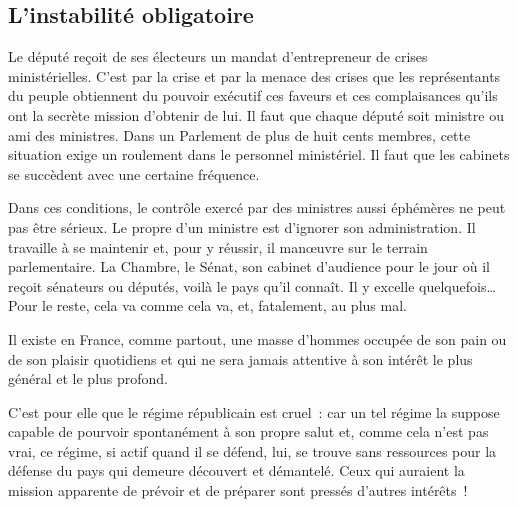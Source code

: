 \documentclass[french,twoside]{book} %
\newcommand{\astermono}{\medskip\centerline{\color{rubric}\large\selectfont{\syms ✻}}\medskip\par}%
\begin{document}
\subsection[{L’instabilité obligatoire}]{L’instabilité obligatoire}
\noindent Le député reçoit de ses électeurs un mandat d’entrepreneur de crises ministérielles. C’est par la crise et par la menace des crises que les représentants du peuple obtiennent du pouvoir exécutif ces faveurs et ces complaisances qu’ils ont la secrète mission d’obtenir de lui. Il faut que chaque député soit ministre ou ami des ministres. Dans un Parlement de plus de huit cents membres, cette situation exige un roulement dans le personnel ministériel. Il faut que les cabinets se succèdent avec une certaine fréquence.\par
Dans ces conditions, le contrôle exercé par des ministres aussi éphémères ne peut pas être sérieux. Le propre d’un ministre est d’ignorer son administration. Il travaille à se maintenir et, pour y réussir, il manœuvre sur le terrain parlementaire. La Chambre, le Sénat, son cabinet d’audience pour le jour où il reçoit sénateurs ou députés, voilà le pays qu’il connaît. Il y excelle quelquefois… Pour le reste, cela va comme cela va, et, fatalement, au plus mal.\par
Il existe en France, comme partout, une masse d’hommes occupée de son pain ou de son plaisir quotidiens et qui ne sera jamais attentive à son intérêt le plus général et le plus profond.\par
C’est pour elle que le régime républicain est cruel : car un tel régime la suppose capable de pourvoir spontanément à son propre salut et, comme cela n’est pas vrai, ce régime, si actif quand il se défend, lui, se trouve sans ressources pour la défense du pays qui demeure découvert et démantelé. Ceux qui auraient la mission apparente de prévoir et de préparer sont pressés d’autres intérêts !\par

\astermono
\end{document}
